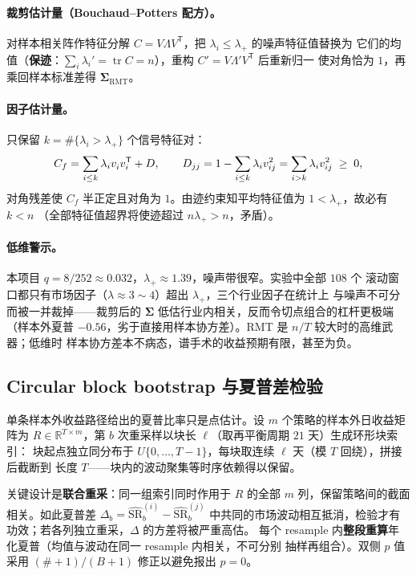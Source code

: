 \documentclass[12pt]{ctexart}
\newcommand{\R}{\mathbb{R}}
\newcommand{\Sig}{\bm{\Sigma}}
\newcommand{\T}{^{\mathsf{T}}}
\DeclareMathOperator{\tr}{tr}
\theoremstyle{definition}
\theoremstyle{plain}
\begin{document}
\paragraph{裁剪估计量（Bouchaud--Potters 配方）。}
对样本相关阵作特征分解 $C=V\Lambda V\T$，把 $\lambda_i\le\lambda_+$ 的噪声特征值替换为
它们的均值（\textbf{保迹}：$\sum_i\lambda_i'=\tr C=n$），重构 $C'=V\Lambda'V\T$ 后重新归一
使对角恰为 $1$，再乘回样本标准差得 $\Sig_{\mathrm{RMT}}$。

\paragraph{因子估计量。}
只保留 $k=\#\{\lambda_i>\lambda_+\}$ 个信号特征对：
\begin{equation}
C_f=\sum_{i\le k}\lambda_i v_i^{\vphantom{\T}}v_i\T + D,\qquad
D_{jj}=1-\sum_{i\le k}\lambda_i v_{ij}^2=\sum_{i>k}\lambda_i v_{ij}^2\;\ge\;0 ,
\end{equation}
对角残差使 $C_f$ 半正定且对角为 $1$。由迹约束知平均特征值为 $1<\lambda_+$，故必有 $k<n$
（全部特征值超界将使迹超过 $n\lambda_+>n$，矛盾）。

\paragraph{低维警示。}
本项目 $q=8/252\approx0.032$，$\lambda_+\approx1.39$，噪声带很窄。实验中全部 $108$ 个
滚动窗口都只有市场因子（$\lambda\approx3\sim4$）超出 $\lambda_+$，三个行业因子在统计上
与噪声不可分而被一并裁掉——裁剪后的 $\Sig$ 低估行业内相关，反而令切点组合的杠杆更极端
（样本外夏普 $-0.56$，劣于直接用样本协方差）。RMT 是 $n/T$ 较大时的高维武器；低维时
样本协方差本不病态，谱手术的收益预期有限，甚至为负。

\subsection{Circular block bootstrap 与夏普差检验}

单条样本外收益路径给出的夏普比率只是点估计。设 $m$ 个策略的样本外日收益矩阵为
$R\in\R^{T\times m}$，第 $b$ 次重采样以块长 $\ell$（取再平衡周期 $21$ 天）生成环形块索引：
块起点独立同分布于 $U\{0,\dots,T-1\}$，每块取连续 $\ell$ 天（模 $T$ 回绕），拼接后截断到
长度 $T$——块内的波动聚集等时序依赖得以保留。

关键设计是\textbf{联合重采}：同一组索引同时作用于 $R$ 的全部 $m$ 列，保留策略间的截面
相关。如此夏普差 $\Delta_b=\widehat{\mathrm{SR}}^{(i)}_b-\widehat{\mathrm{SR}}^{(j)}_b$
中共同的市场波动相互抵消，检验才有功效；若各列独立重采，$\Delta$ 的方差将被严重高估。
每个 resample 内\textbf{整段重算}年化夏普（均值与波动在同一 resample 内相关，不可分别
抽样再组合）。双侧 $p$ 值采用 $(\#+1)/(B+1)$ 修正以避免报出 $p=0$。
\end{document}
